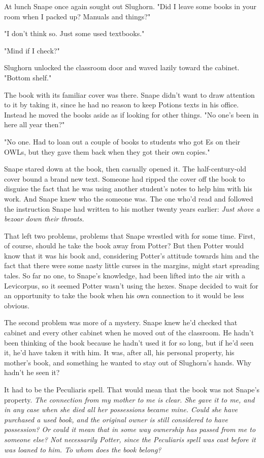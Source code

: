 \documentclass[a4paper,11pt]{article}
\begin{document}
At lunch Snape once again sought out Slughorn. "Did I leave some books in your room when I packed up? Manuals and things?"

"I don't think so. Just some used textbooks."

"Mind if I check?"

Slughorn unlocked the classroom door and waved lazily toward the cabinet. "Bottom shelf."

The book with its familiar cover was there. Snape didn't want to draw attention to it by taking it, since he had no reason to keep Potions texts in his office. Instead he moved the books aside as if looking for other things. "No one's been in here all year then?"

"No one. Had to loan out a couple of books to students who got Es on their OWLs, but they gave them back when they got their own copies."

Snape stared down at the book, then casually opened it. The half-century-old cover bound a brand new text. Someone had ripped the cover off the book to disguise the fact that he was using another student's notes to help him with his work. And Snape knew who the someone was. The one who'd read and followed the instruction Snape had written to his mother twenty years earlier: \emph{Just shove a bezoar down their throats.}

That left two problems, problems that Snape wrestled with for some time. First, of course, should he take the book away from Potter? But then Potter would know that it was his book and, considering Potter's attitude towards him and the fact that there were some nasty little curses in the margins, might start spreading tales. So far no one, to Snape's knowledge, had been lifted into the air with a Levicorpus, so it seemed Potter wasn't using the hexes. Snape decided to wait for an opportunity to take the book when his own connection to it would be less obvious.

The second problem was more of a mystery. Snape knew he'd checked that cabinet and every other cabinet when he moved out of the classroom. He hadn't been thinking of the book because he hadn't used it for so long, but if he'd seen it, he'd have taken it with him. It was, after all, his personal property, his mother's book, and something he wanted to stay out of Slughorn's hands. Why hadn't he seen it?

It had to be the Peculiaris spell. That would mean that the book was not Snape's property. \emph{The connection from my mother to me is clear. She gave it to me, and in any case when she died all her possessions became mine. Could she have purchased a used book, and the original owner is still considered to have possession? Or could it mean that in some way ownership has passed from me to someone else? Not necessarily Potter, since the Peculiaris spell was cast before it was loaned to him. To whom does the book belong?}
\end{document}
